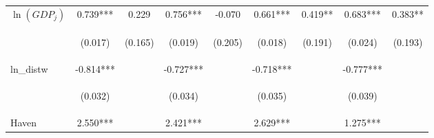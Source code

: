 \begin{center}
\begin{tabular}{lcccccccc}
$\ln(GDP_j)$ & 0.739*** & 0.229 & 0.756*** & -0.070 & 0.661*** & 0.419** & 0.683*** & 0.383** \\
\vspace{4pt} & \begin{footnotesize}(0.017)\end{footnotesize} & \begin{footnotesize}(0.165)\end{footnotesize} & \begin{footnotesize}(0.019)\end{footnotesize} & \begin{footnotesize}(0.205)\end{footnotesize} & \begin{footnotesize}(0.018)\end{footnotesize} & \begin{footnotesize}(0.191)\end{footnotesize} & \begin{footnotesize}(0.024)\end{footnotesize} & \begin{footnotesize}(0.193)\end{footnotesize} \\
ln\_distw & -0.814*** &  & -0.727*** &  & -0.718*** &  & -0.777*** &  \\
\vspace{4pt} & \begin{footnotesize}(0.032)\end{footnotesize} & \begin{footnotesize}\end{footnotesize} & \begin{footnotesize}(0.034)\end{footnotesize} & \begin{footnotesize}\end{footnotesize} & \begin{footnotesize}(0.035)\end{footnotesize} & \begin{footnotesize}\end{footnotesize} & \begin{footnotesize}(0.039)\end{footnotesize} & \begin{footnotesize}\end{footnotesize} \\
Haven & 2.550*** &  & 2.421*** &  & 2.629*** &  & 1.275*** &  \\

\end{tabular}
\end{center}
